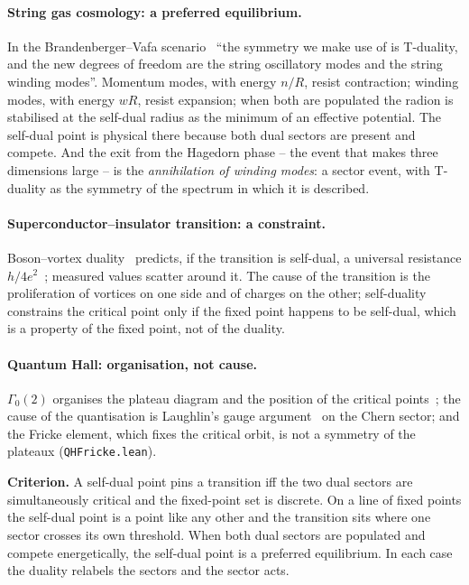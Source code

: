 \documentclass[11pt,a4paper]{article}
\newcommand{\lean}[1]{\texttt{\small #1}}
\begin{document}
\paragraph{String gas cosmology: a preferred equilibrium.} In the Brandenberger--Vafa
scenario~\cite{BrandenbergerVafa1989,Brandenberger2008} ``the symmetry we make use of is T-duality, and the new
degrees of freedom are the string oscillatory modes and the string winding modes''. Momentum modes, with energy
$n/R$, resist contraction; winding modes, with energy $wR$, resist expansion; when both are populated the radion is
stabilised at the self-dual radius as the minimum of an effective potential. The self-dual point is physical there
because both dual sectors are present and compete. And the exit from the Hagedorn phase -- the event that makes
three dimensions large -- is the \emph{annihilation of winding modes}: a sector event, with T-duality as the
symmetry of the spectrum in which it is described.

\paragraph{Superconductor--insulator transition: a constraint.} Boson--vortex duality~\cite{DasguptaHalperin1981,
FisherLee1989} predicts, if the transition is self-dual, a universal resistance $h/4e^2$~\cite{Fisher1990,
ChaFisherGirvin1991}; measured values scatter around it. The cause of the transition is the proliferation of
vortices on one side and of charges on the other; self-duality constrains the critical point only if the fixed
point happens to be self-dual, which is a property of the fixed point, not of the duality.

\paragraph{Quantum Hall: organisation, not cause.} $\Gamma_0(2)$ organises the plateau diagram and the position
of the critical points~\cite{LutkenRoss1992}; the cause of the quantisation is Laughlin's gauge
argument~\cite{Laughlin1981} on the Chern sector; and the Fricke element, which fixes the critical orbit, is not a
symmetry of the plateaux (\lean{QHFricke.lean}).

\begin{keybox}
\textbf{Criterion.} A self-dual point pins a transition iff the two dual sectors are simultaneously critical and
the fixed-point set is discrete. On a line of fixed points the self-dual point is a point like any other and the
transition sits where one sector crosses its own threshold. When both dual sectors are populated and compete
energetically, the self-dual point is a preferred equilibrium. In each case the duality relabels the sectors and
the sector acts.
\end{keybox}
\end{document}
